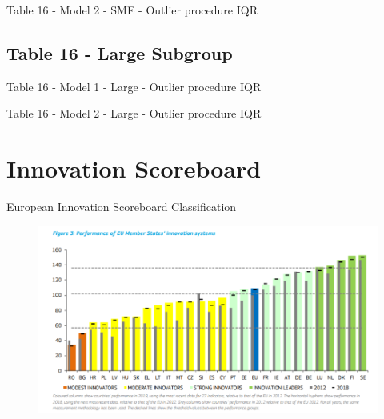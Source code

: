 \documentclass{beamer}					%
\begin{document}
%		
	
	\begin{frame}{Table 16 - Model 2 - SME - Outlier procedure IQR}
		
	\end{frame}

%		

	\subsection{Table 16 - Large Subgroup}
	
	\begin{frame}{Table 16 - Model 1 - Large - Outlier procedure IQR}
		
	\end{frame}	

%		

	\begin{frame}{Table 16 - Model 2 - Large - Outlier procedure IQR}
		
	\end{frame}	

%		
	
	\section{Innovation Scoreboard}
	
	\begin{frame}{European Innovation Scoreboard Classification}
		\begin{figure}[H]
			\centering
			\includegraphics[width=1.\textwidth]{InnovationScoreboard.png}
			\label{fig:figure1}
		\end{figure}
	\end{frame}
	
\end{document}
